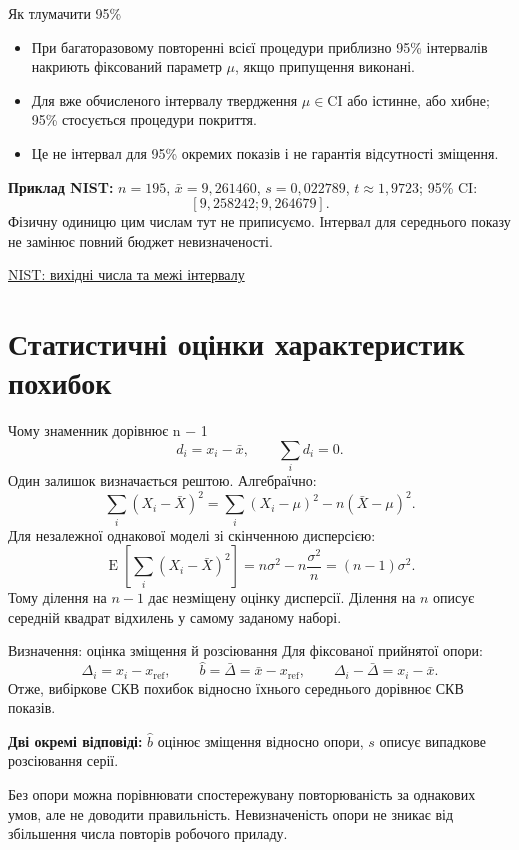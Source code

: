 \documentclass[aspectratio=169,11pt]{beamer}
\newcommand{\src}[2]{\par\vfill{\tiny\href{#1}{#2}}}
\newcommand{\E}{\operatorname{E}}
\newcommand{\xref}{x_{\mathrm{ref}}}
\begin{document}
\begin{frame}{Як тлумачити 95\%}
\begin{itemize}
\item При багаторазовому повторенні всієї процедури приблизно 95\% інтервалів накриють фіксований параметр $\mu$, якщо припущення виконані.
\item Для вже обчисленого інтервалу твердження $\mu\in\mathrm{CI}$ або істинне, або хибне; 95\% стосується процедури покриття.
\item Це не інтервал для 95\% окремих показів і не гарантія відсутності зміщення.
\end{itemize}
\textbf{Приклад NIST:} $n=195$, $\bar x=9{,}261460$, $s=0{,}022789$, $t\approx1{,}9723$; 95\% CI:
\[
[9{,}258242;9{,}264679].
\]
Фізичну одиницю цим числам тут не приписуємо. Інтервал для середнього показу не замінює повний бюджет невизначеності.
\src{https://www.itl.nist.gov/div898/handbook/eda/section3/eda352.htm}{NIST: вихідні числа та межі інтервалу}
\end{frame}

\section{Статистичні оцінки характеристик похибок}
\begin{frame}{Чому знаменник дорівнює n − 1}
\[
d_i=x_i-\bar x,\qquad \sum_i d_i=0.
\]
Один залишок визначається рештою. Алгебраїчно:
\[
\sum_i(X_i-\bar X)^2
=\sum_i(X_i-\mu)^2-n(\bar X-\mu)^2.
\]
Для незалежної однакової моделі зі скінченною дисперсією:
\[
\E\!\left[\sum_i(X_i-\bar X)^2\right]
=n\sigma^2-n\frac{\sigma^2}{n}=(n-1)\sigma^2.
\]
Тому ділення на $n-1$ дає незміщену оцінку дисперсії. Ділення на $n$ описує середній квадрат відхилень у самому заданому наборі.
\end{frame}

\begin{frame}{Визначення: оцінка зміщення й розсіювання}
Для фіксованої прийнятої опори:
\[
\Delta_i=x_i-\xref,\qquad
\widehat b=\bar\Delta=\bar x-\xref,
\qquad \Delta_i-\bar\Delta=x_i-\bar x.
\]
Отже, вибіркове СКВ похибок відносно їхнього середнього дорівнює СКВ показів.
\medskip

\textbf{Дві окремі відповіді:} $\widehat b$ оцінює зміщення відносно опори, $s$ описує випадкове розсіювання серії.
\medskip

Без опори можна порівнювати спостережувану повторюваність за однакових умов, але не доводити правильність. Невизначеність опори не зникає від збільшення числа повторів робочого приладу.
\end{frame}
\end{document}
